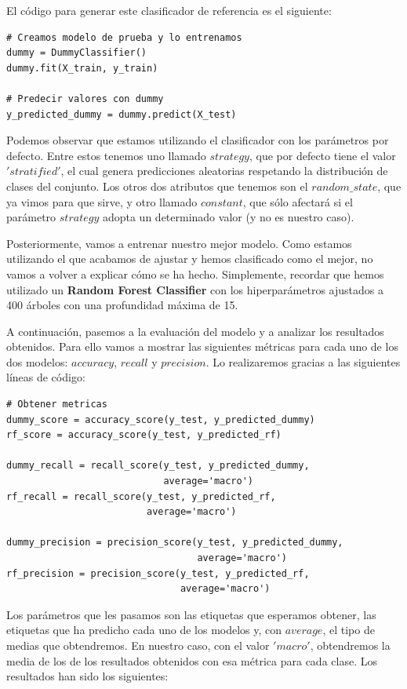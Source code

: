 \documentclass[11pt,a4paper]{article}
\begin{document}
El código para generar este clasificador de referencia es el siguiente:

\begin{lstlisting}
# Creamos modelo de prueba y lo entrenamos
dummy = DummyClassifier()
dummy.fit(X_train, y_train)

# Predecir valores con dummy
y_predicted_dummy = dummy.predict(X_test)
\end{lstlisting}

Podemos observar que estamos utilizando el clasificador con los parámetros por defecto. Entre estos tenemos uno llamado $strategy$, que por defecto
tiene el valor $'stratified'$, el cual genera predicciones aleatorias respetando la distribución de clases del conjunto. Los otros dos atributos que
tenemos son el $random\_state$, que ya vimos para que sirve, y otro llamado $constant$, que sólo afectará si el parámetro $strategy$ adopta un
determinado valor (y no es nuestro caso).

Posteriormente, vamos a entrenar nuestro mejor modelo. Como estamos utilizando el que acabamos de ajustar y hemos clasificado como el mejor, no vamos a
volver a explicar cómo se ha hecho. Simplemente, recordar que hemos utilizado un \textbf{Random Forest Classifier} con los hiperparámetros ajustados a 400 árboles con una
profundidad máxima de 15.

A continuación, pasemos a la evaluación del modelo y a analizar los resultados obtenidos. Para ello vamos a mostrar las siguientes métricas para cada
uno de los dos modelos: $accuracy$, $recall$ y $precision$. Lo realizaremos gracias a las siguientes líneas de código:

\begin{lstlisting}
# Obtener metricas
dummy_score = accuracy_score(y_test, y_predicted_dummy)
rf_score = accuracy_score(y_test, y_predicted_rf)

dummy_recall = recall_score(y_test, y_predicted_dummy,
                            average='macro')
rf_recall = recall_score(y_test, y_predicted_rf,
                         average='macro')

dummy_precision = precision_score(y_test, y_predicted_dummy,
                                  average='macro')
rf_precision = precision_score(y_test, y_predicted_rf,
                               average='macro')
\end{lstlisting}

Los parámetros que les pasamos son las etiquetas que esperamos obtener, las etiquetas que ha predicho cada uno de los modelos y, con
$average$, el tipo de medias que obtendremos. En nuestro caso, con el valor $'macro'$, obtendremos la media de los de los resultados obtenidos
con esa métrica para cada clase. Los resultados han sido los siguientes:
\end{document}
